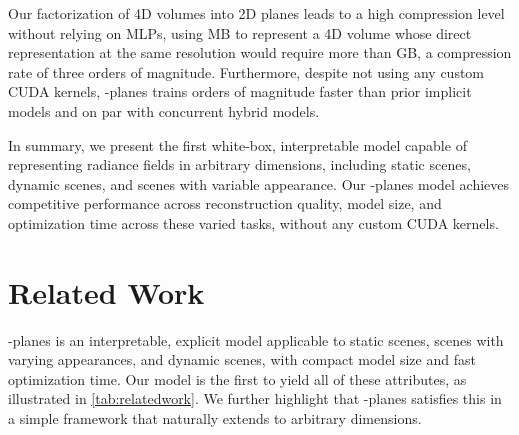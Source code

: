 \documentclass[10pt,twocolumn,letterpaper]{article}
\newcommand{\modelname}{-planes}
\newcommand{\Modelname}{-planes}
\begin{document}
Our factorization of 4D volumes into 2D planes leads to a high compression level without relying on MLPs, using  MB to represent a 4D volume whose direct representation at the same resolution would require more than  GB, a compression rate of three orders of magnitude.
Furthermore, despite not using any custom CUDA kernels, \modelname{} trains orders of magnitude faster than prior implicit models and on par with concurrent hybrid models.

In summary, we present the first white-box, interpretable model capable of representing radiance fields in arbitrary dimensions, including static scenes, dynamic scenes, and scenes with variable appearance. Our \modelname{} model achieves competitive performance across reconstruction quality, model size, and optimization time across these varied tasks, without any custom CUDA kernels.




 \section{Related Work}
\label{sec:related_work}

\Modelname{} is an interpretable, explicit model applicable to static scenes, scenes with varying appearances, and dynamic scenes, with compact model size and fast optimization time. Our model is the first to yield all of these attributes, as illustrated in \cref{tab:relatedwork}. 
We further highlight that \modelname{} satisfies this in a simple framework that naturally extends to arbitrary dimensions.  
\end{document}

